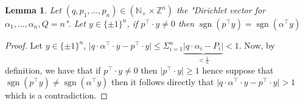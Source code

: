 \documentclass[a4paper,11pt,american]{article}
\newcommand{\N}{\mathbb{N}}
\newcommand{\Z}{\mathbb{Z}}
\DeclareMathOperator{\sign}{sgn}
\theoremstyle{plain}
\newtheorem{lemma}[theorem]{Lemma}
\theoremstyle{definition}
\begin{document}
\begin{lemma}
    Let $(q,p_1,\dots,p_n)\in (\N_+\times\Z^n)$ the "Dirichlet vector for $\alpha_1,\dots,\alpha_n,Q=n$". Let $y\in\{\pm 1\}^n$, if $p^\top\cdot y\neq 0$ then $\sign(p^\top y)=\sign(\alpha^\top y)$
\end{lemma}
\begin{proof}
    Let $y\in\{\pm 1\}^n$, $\vert q\cdot\alpha^\top\cdot y-p^\top\cdot y\vert\leq \Sigma_{i=1}^n\underbrace{\vert q\cdot\alpha_i-P_{i}\vert}_{< \frac{1}{n}}< 1$. Now, by definition, we have that if $p^\top\cdot y\neq 0$ then $\vert p^\top\cdot y\vert \geq 1$ hence suppose that $\sign(p^\top y)\neq\sign(\alpha^\top y)$ then it follows directly that $\vert q\cdot\alpha^\top\cdot y-p^\top\cdot y\vert> 1$ which is a contradiction.
\end{proof}


\end{document}
